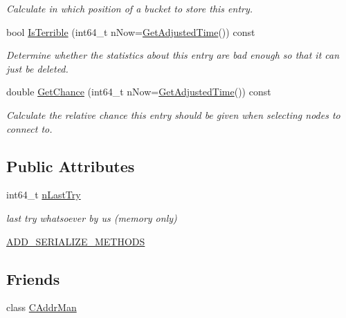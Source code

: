 \begin{DoxyCompactItemize}
\begin{DoxyCompactList}\small\item\em Calculate in which position of a bucket to store this entry. \end{DoxyCompactList}\item 
bool \hyperlink{class_c_addr_info_a1fd74c1bd7a8eb3c234bf222f028e94c}{Is\+Terrible} (int64\+\_\+t n\+Now=\hyperlink{timedata_8h_a09f81b9c7650f898cf3cf305b87547e6}{Get\+Adjusted\+Time}()) const 
\begin{DoxyCompactList}\small\item\em Determine whether the statistics about this entry are bad enough so that it can just be deleted. \end{DoxyCompactList}\item 
double \hyperlink{class_c_addr_info_a264f9856d499cf077aa5c82327302307}{Get\+Chance} (int64\+\_\+t n\+Now=\hyperlink{timedata_8h_a09f81b9c7650f898cf3cf305b87547e6}{Get\+Adjusted\+Time}()) const 
\begin{DoxyCompactList}\small\item\em Calculate the relative chance this entry should be given when selecting nodes to connect to. \end{DoxyCompactList}\end{DoxyCompactItemize}
\subsection*{Public Attributes}
\begin{DoxyCompactItemize}
\item 
int64\+\_\+t \hyperlink{class_c_addr_info_a4569955918c204d2edd073456108ddfd}{n\+Last\+Try}
\begin{DoxyCompactList}\small\item\em last try whatsoever by us (memory only) \end{DoxyCompactList}\item 
\hyperlink{class_c_addr_info_a9d5e0b95fa494171e4bffb900094fe2e}{A\+D\+D\+\_\+\+S\+E\+R\+I\+A\+L\+I\+Z\+E\+\_\+\+M\+E\+T\+H\+O\+D\+S}
\end{DoxyCompactItemize}
\subsection*{Friends}
\begin{DoxyCompactItemize}
\item 
class \hyperlink{class_c_addr_info_a17ec4e9e560da58786d2ca36092bf83d}{C\+Addr\+Man}
\end{DoxyCompactItemize}
